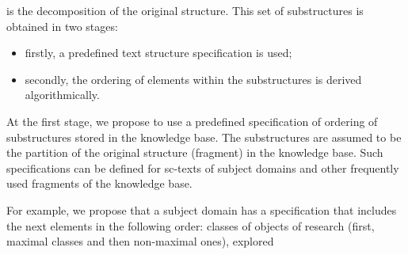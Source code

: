 \documentclass{scndocument}
\begin{document}
\begin{SCn}
\begin{multicols}{2}
\begin{justify}
is the decomposition of the original structure.
This set of substructures is obtained in two stages:
\end{justify}
\begin{itemize}
\item firstly, a predefined text structure specification is
used;
\item secondly, the ordering of elements within the substructures is derived algorithmically.
\end{itemize}
\begin{justify}
At the first stage, we propose to use a predefined
specification of ordering of substructures stored in the
knowledge base. The substructures are assumed to be
the partition of the original structure (fragment) in the
knowledge base. Such specifications can be defined for
sc-texts of subject domains and other frequently used
fragments of the knowledge base.\par
For example, we propose that a subject domain has
a specification that includes the next elements in the
following order: classes of objects of research (first,
maximal classes and then non-maximal ones), explored
\end{justify}
\end{multicols}
\end{SCn}
\end{document}
